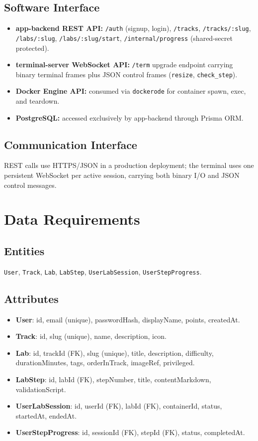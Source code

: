 \documentclass[11pt]{article}
\begin{document}
\subsection{Software Interface}
\begin{itemize}
\item \textbf{app-backend REST API:} \texttt{/auth} (signup, login),
      \texttt{/tracks}, \texttt{/tracks/:slug}, \texttt{/labs/:slug},
      \texttt{/labs/:slug/start}, \texttt{/internal/progress}
      (shared-secret protected).
\item \textbf{terminal-server WebSocket API:} \texttt{/term} upgrade
      endpoint carrying binary terminal frames plus JSON control
      frames (\texttt{resize}, \texttt{check\_step}).
\item \textbf{Docker Engine API:} consumed via \texttt{dockerode} for
      container spawn, exec, and teardown.
\item \textbf{PostgreSQL:} accessed exclusively by app-backend through
      Prisma ORM.
\end{itemize}

\subsection{Communication Interface}
REST calls use HTTPS/JSON in a production deployment; the terminal
uses one persistent WebSocket per active session, carrying both binary
I/O and JSON control messages.

\section{Data Requirements}

\subsection{Entities}
\texttt{User}, \texttt{Track}, \texttt{Lab}, \texttt{LabStep},
\texttt{UserLabSession}, \texttt{UserStepProgress}.

\subsection{Attributes}
\begin{itemize}
\item \textbf{User}: id, email (unique), passwordHash, displayName,
      points, createdAt.
\item \textbf{Track}: id, slug (unique), name, description, icon.
\item \textbf{Lab}: id, trackId (FK), slug (unique), title,
      description, difficulty, durationMinutes, tags, orderInTrack,
      imageRef, privileged.
\item \textbf{LabStep}: id, labId (FK), stepNumber, title,
      contentMarkdown, validationScript.
\item \textbf{UserLabSession}: id, userId (FK), labId (FK),
      containerId, status, startedAt, endedAt.
\item \textbf{UserStepProgress}: id, sessionId (FK), stepId (FK),
      status, completedAt.
\end{itemize}
\end{document}
